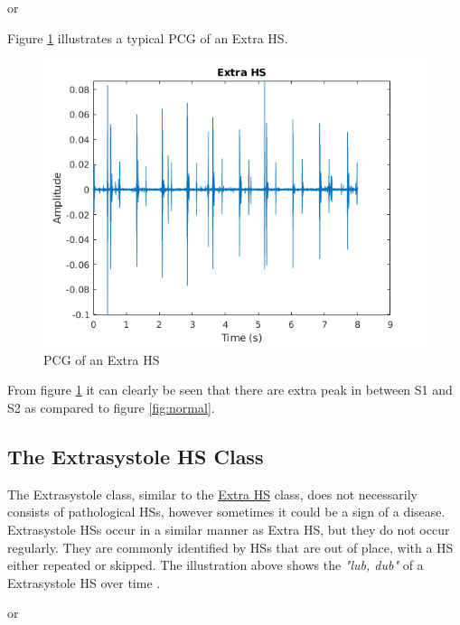\documentclass[10pt,twocolumn]{witseiepaper}
\begin{document}
\hspace{3.5cm} or 


Figure \ref{fig:extra} illustrates a typical PCG of an Extra HS.
\begin{figure}[h!]
    \centering
    \includegraphics[scale = 0.45]{./extra.png}
    \caption{PCG of an Extra HS}
    \label{fig:extra}
\end{figure}{}

From figure \ref{fig:extra} it can clearly be seen that there are extra peak in between S1 and S2 as compared to figure \ref{fig:normal}.

\subsection*{The Extrasystole HS Class}
The Extrasystole class, similar to the \hyperref[sec:extra]{Extra HS} class, does not necessarily consists of pathological HSs, however sometimes it could be a sign of a disease. Extrasystole HSs occur in a similar manner as Extra HS, but they do not occur regularly. They are commonly identified by HSs that are out of place, with a HS either repeated or skipped. The illustration above shows the \textit{"lub, dub"} of a Extrasystole HS over time \cite{bentley}.


\hspace{3.5cm} or 
\end{document}
